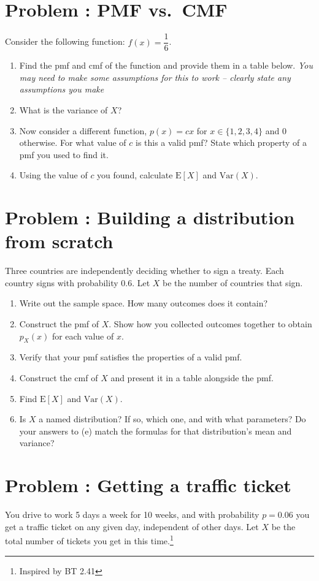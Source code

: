 \documentclass[11pt]{article}
\newcommand{\E}{\mathrm{E}}
\newcommand{\Var}{\mathrm{Var}}
\newcounter{problem}
\newcommand{\problem}[1]{\stepcounter{problem}\section*{Problem \theproblem: #1}}
\begin{document}
\problem{PMF vs.\ CMF}

Consider the following function: $f(x) = \dfrac{1}{6}$.

\begin{enumerate}[label=\alph*.]
\item Find the pmf and cmf of the function and provide them in a table below.
\textit{You may need to make some assumptions for this to work -- clearly state any assumptions you make}
\item What is the variance of $X$?
\item Now consider a different function, $p(x) = cx$ for
  $x \in \{1, 2, 3, 4\}$ and $0$ otherwise. For what value of $c$ is
  this a valid pmf? State which property of a pmf you used to find it.
\item Using the value of $c$ you found, calculate $\E[X]$ and
  $\Var(X)$.
\end{enumerate}

\problem{Building a distribution from scratch}

Three countries are independently deciding whether to sign a treaty.
Each country signs with probability $0.6$. Let $X$ be the number of
countries that sign.

\begin{enumerate}[label=\alph*.]
\item Write out the sample space. How many outcomes does it contain?
\item Construct the pmf of $X$. Show how you collected outcomes
  together to obtain $p_X(x)$ for each value of $x$.
\item Verify that your pmf satisfies the properties of a valid pmf.
\item Construct the cmf of $X$ and present it in a table alongside the
  pmf.
\item Find $\E[X]$ and $\Var(X)$.
\item Is $X$ a named distribution? If so, which one, and with what
  parameters? Do your answers to (e) match the formulas for that
  distribution's mean and variance?
\end{enumerate}

\problem{Getting a traffic ticket}

You drive to work 5 days a week for 10 weeks, and with
probability $p = 0.06$ you get a traffic ticket on any given day,
independent of other days. Let $X$ be the total number of tickets you
get in this time.\footnote{Inspired by BT 2.41}
\end{document}
